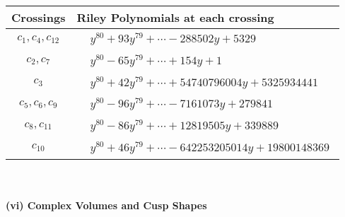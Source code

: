 \documentclass[1p]{elsarticle_modified}
\theoremstyle{definition}
\begin{document}
\begin{tabular}{m{50pt}|m{274pt}}
Crossings & \hspace{64pt}Riley Polynomials at each crossing \\
\hline $$\begin{aligned}c_{1},c_{4},c_{12}\end{aligned}$$&$\begin{aligned}
&y^{80}+93 y^{79}+\cdots-288502 y+5329
\end{aligned}$\\
\hline $$\begin{aligned}c_{2},c_{7}\end{aligned}$$&$\begin{aligned}
&y^{80}-65 y^{79}+\cdots+154 y+1
\end{aligned}$\\
\hline $$\begin{aligned}c_{3}\end{aligned}$$&$\begin{aligned}
&y^{80}+42 y^{79}+\cdots+54740796004 y+5325934441
\end{aligned}$\\
\hline $$\begin{aligned}c_{5},c_{6},c_{9}\end{aligned}$$&$\begin{aligned}
&y^{80}-96 y^{79}+\cdots-7161073 y+279841
\end{aligned}$\\
\hline $$\begin{aligned}c_{8},c_{11}\end{aligned}$$&$\begin{aligned}
&y^{80}-86 y^{79}+\cdots+12819505 y+339889
\end{aligned}$\\
\hline $$\begin{aligned}c_{10}\end{aligned}$$&$\begin{aligned}
&y^{80}+46 y^{79}+\cdots-642253205014 y+19800148369
\end{aligned}$\\
\hline
\end{tabular}\\~\\
\newpage\flushleft \textbf{(vi) Complex Volumes and Cusp Shapes}
\end{document}
